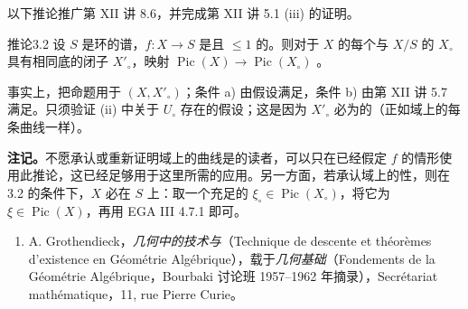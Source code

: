 以下推论推广第 XII 讲 8.6，并完成第 XII 讲 5.1 (iii) 的证明。
\begin{SGAresult}{推论}{3.2}
设 $S$ 是环的谱，$f:X\to S$ 是且 $\leq1$ 的。则对于 $X$ 的每个与 $X/S$ 的 $X_\circ$ 具有相同底的闭子 $X'_\circ$，映射 $\operatorname{Pic}(X)\to\operatorname{Pic}(X_\circ)$ 。
\end{SGAresult}
事实上，把命题用于 $(X,X'_\circ)$；条件 a) 由假设满足，条件 b) 由第 XII 讲 5.7 满足。只须验证 (ii) 中关于 $U_\circ$ 存在的假设；这是因为 $X'_\circ$ 必为的（正如域上的每条曲线一样）。

\textbf{注记。}不愿承认或重新证明域上的曲线是的读者，可以只在已经假定 $f$ 的情形使用此推论，这已经足够用于这里所需的应用。另一方面，若承认域上的性，则在 3.2 的条件下，$X$ 必在 $S$ 上：取一个充足的 $\xi_\circ\in\operatorname{Pic}(X_\circ)$，将它为 $\xi\in\operatorname{Pic}(X)$，再用 EGA III 4.7.1 即可。

\begin{enumerate}
\item[{[1]}] A. Grothendieck，\emph{几何中的技术与}（Technique de descente et théorèmes d'existence en Géométrie Algébrique），载于\emph{几何基础}（Fondements de la Géométrie Algébrique，Bourbaki 讨论班 1957--1962 年摘录），Secrétariat mathématique，11, rue Pierre Curie。
\end{enumerate}

